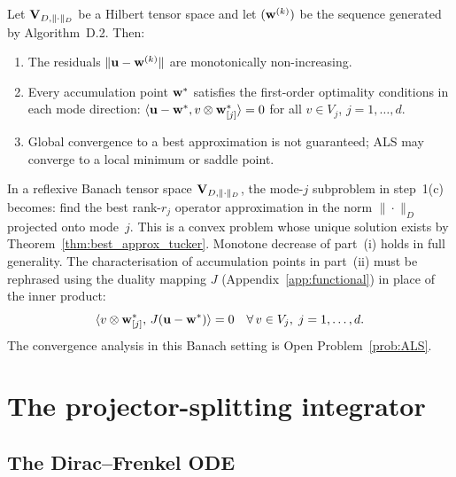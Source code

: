 \begin{theorem}
\label{thm:app:als_convergence}
Let $\mathbf{V}_{D,\|\cdot\|_D}$ be a Hilbert tensor space and let $(\mathbf{w}^{(k)})$ be
the sequence generated by \textup{Algorithm~D.2}. Then:
\begin{enumerate}
\item[\textup{(i)}] The residuals $\|\mathbf{u} - \mathbf{w}^{(k)}\|$ are monotonically
    non-increasing.
\item[\textup{(ii)}] Every accumulation point $\mathbf{w}^*$ satisfies
    the first-order optimality conditions in each mode direction:
    $\langle \mathbf{u} - \mathbf{w}^*, v \otimes \mathbf{w}^*_{[j]}\rangle = 0$
    for all $v \in V_j$, $j = 1,\ldots,d$.
\item[\textup{(iii)}] Global convergence to a best approximation is
    not guaranteed; ALS may converge to a local minimum or saddle point.
\end{enumerate}
\end{theorem}

\begin{remark}
\label{rem:app:als_banach}
In a reflexive Banach tensor space $\mathbf{V}_{D,\|\cdot\|_D}$, the mode-$j$ subproblem
in step~1(c) becomes: find the best rank-$r_j$ operator approximation
in the norm $\|\cdot\|_D$ projected onto mode~$j$. This is a convex
problem whose unique solution exists by
Theorem~\ref{thm:best_approx_tucker}. Monotone decrease of part~(i)
holds in full generality. The characterisation of accumulation points
in part~(ii) must be rephrased using the duality mapping $J$
(Appendix~\ref{app:functional}) in place of the inner product:
\begin{equation*}
    \langle v \otimes \mathbf{w}^*_{[j]},\,
    J(\mathbf{u} - \mathbf{w}^*)\rangle = 0
    \quad \forall\, v \in V_j,\; j = 1,\ldots,d.
\end{equation*}
The convergence analysis in this Banach setting is Open
Problem~\ref{prob:ALS}.
\end{remark}

\section{The projector-splitting integrator}
\label{app:alg:splitting}

\subsection*{The Dirac--Frenkel ODE}


